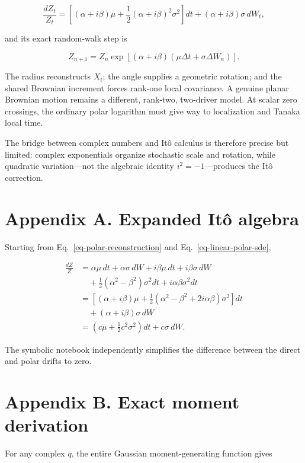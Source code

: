 \documentclass[
  english,
  10pt,
  letterpaper,
  DIV=11,
  numbers=noendperiod]{scrartcl}
\theoremstyle{plain}
\theoremstyle{remark}
\begin{document}
\[
\frac{dZ_t}{Z_t}
=\left[
(\alpha+i\beta)\mu
+\frac12(\alpha+i\beta)^2\sigma^2
\right]dt
+(\alpha+i\beta)\sigma\,dW_t,
\]

and its exact random-walk step is

\[
Z_{n+1}
=Z_n\exp\!\left[
(\alpha+i\beta)
(\mu\Delta t+\sigma\Delta W_n)
\right].
\]

The radius reconstructs \(X_t\); the angle supplies a geometric
rotation; and the shared Brownian increment forces rank-one local
covariance. A genuine planar Brownian motion remains a different,
rank-two, two-driver model. At scalar zero crossings, the ordinary polar
logarithm must give way to localization and Tanaka local time.

The bridge between complex numbers and Itô calculus is therefore precise
but limited: complex exponentials organize stochastic scale and
rotation, while quadratic variation---not the algebraic identity
\(i^2=-1\)---produces the Itô correction.

\section{Appendix A. Expanded Itô algebra}\label{sec-appendix-ito}

Starting from Eq.~\ref{eq-polar-reconstruction} and
Eq.~\ref{eq-linear-polar-sde},

\[
\begin{aligned}
\frac{dZ}{Z}
&=\alpha\mu\,dt+\alpha\sigma\,dW
  +i\beta\mu\,dt+i\beta\sigma\,dW\\
&\quad+\frac12(\alpha^2-\beta^2)\sigma^2dt
  +i\alpha\beta\sigma^2dt\\
&=\left[
(\alpha+i\beta)\mu
+\frac12(\alpha^2-\beta^2+2i\alpha\beta)\sigma^2
\right]dt\\
&\quad+(\alpha+i\beta)\sigma\,dW\\
&=\left(c\mu+\frac12c^2\sigma^2\right)dt+c\sigma\,dW.
\end{aligned}
\]

The symbolic notebook independently simplifies the difference between
the direct and polar drifts to zero.

\section{Appendix B. Exact moment
derivation}\label{sec-appendix-moments}

For any complex \(q\), the entire Gaussian moment-generating function
gives
\end{document}
